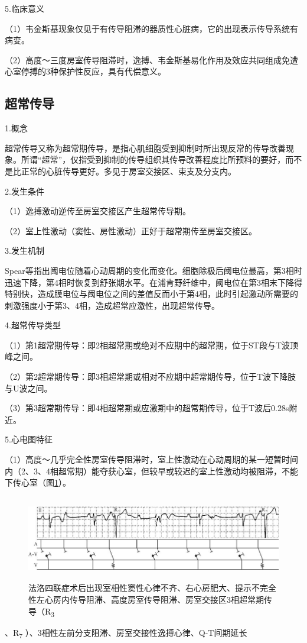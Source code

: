 5.临床意义

（1）韦金斯基现象仅见于有传导阻滞的器质性心脏病，它的出现表示传导系统有病变。

（2）高度～三度房室传导阻滞时，逸搏、韦金斯基易化作用及效应共同组成免遭心室停搏的3种保护性反应，具有代偿意义。

\protect\hypertarget{text00035.htmlux5cux23subid416}{}{}

\subsection{超常传导}

1.概念

超常传导又称为超常期传导，是指心肌细胞受到抑制时所出现反常的传导改善现象。所谓“超常”，仅指受到抑制的传导组织其传导改善程度比所预料的要好，而不是比正常的心脏传导更好。多见于房室交接区、束支及分支内。

2.发生条件

（1）逸搏激动逆传至房室交接区产生超常传导期。

（2）室上性激动（窦性、房性激动）正好于超常期传至房室交接区。

3.发生机制

Spear等指出阈电位随着心动周期的变化而变化。细胞除极后阈电位最高，第3相时迅速下降，第4相时恢复到舒张期水平。在浦肯野纤维中，阈电位在第3相末下降得特别快，造成膜电位与阈电位之间的差值反而小于第4相，此时引起激动所需要的刺激强度小于第3、4相，造成超常应激性，出现超常传导。

4.超常传导类型

（1）第1超常期传导：即2相超常期或绝对不应期中的超常期，位于ST段与T波顶峰之间。

（2）第2超常期传导：即3相超常期或相对不应期中超常期传导，位于T波下降肢与U波之间。

（3）第3超常期传导：即4相超常期或应激期中的超常期传导，位于T波后0.28s附近。

5.心电图特征

（1）高度～几乎完全性房室传导阻滞时，室上性激动在心动周期的某一短暂时间内（2、3、4相超常期）能夺获心室，但较早或较迟的室上性激动均被阻滞，不能下传心室（图\ref{fig28-5}）。

\begin{figure}[!htbp]
 \centering
 \includegraphics[width=5.78125in,height=1.45833in]{./images/Image00465.jpg}
 \captionsetup{justification=centering}
 \caption{法洛四联症术后出现室相性窦性心律不齐、右心房肥大、提示不完全性左心房内传导阻滞、高度房室传导阻滞、房室交接区3相超常期传导（R\textsubscript{3}}
 \label{fig28-5}
  \end{figure} 
、R\textsubscript{7}
）、3相性左前分支阻滞、房室交接性逸搏心律、Q-T间期延长

